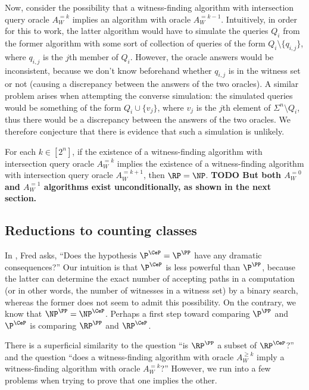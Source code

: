 \documentclass{article}
\newcommand{\todo}[1]{\textbf{TODO #1}}
\begin{document}
Now, consider the possibility that a witness-finding algorithm with intersection query oracle $A^{= k}_W$ implies an algorithm with oracle $A^{= k - 1}_W$.
Intuitively, in order for this to work, the latter algorithm would have to simulate the queries $Q_i$ from the former algorithm with some sort of collection of queries of the form $Q_i \setminus \{q_{i, j}\}$, where $q_{i, j}$ is the $j$th member of $Q_i$.
However, the oracle answers would be inconsistent, because we don't know beforehand whether $q_{i, j}$ is in the witness set or not (causing a discrepancy between the answers of the two oracles).
A similar problem arises when attempting the converse simulation: the simulated queries would be something of the form $Q_i \cup \{v_j\}$, where $v_j$ is the $j$th element of $\Sigma^n \setminus Q_i$, thus there would be a discrepancy between the answers of the two oracles.
We therefore conjecture that there is evidence that such a simulation is unlikely.

\begin{conjecture}
  For each $k \in \left[2^n\right]$, if the existence of a witness-finding algorithm with intersection query oracle $A^{= k}_W$ implies the existence of a witness-finding algorithm with intersection query oracle $A^{= k + 1}_W$, then $\RP = \NP$.
  \todo{But both $A^{= 0}_W$ and $A^{= 1}_W$ algorithms exist unconditionally, as shown in the next section.}
\end{conjecture}

\subsection{Reductions to counting classes}

In \autocite[Section~7]{green93}, Fred asks, ``Does the hypothesis $\P^{\CeP} = \P^\PP$ have any dramatic consequences?''
Our intuition is that $\P^{\CeP}$ is less powerful than $\P^\PP$, because the latter can determine the exact number of accepting paths in a computation (or in other words, the number of witnesses in a witness set) by a binary search, whereas the former does not seem to admit this possibility.
On the contrary, we know that $\NP^\PP = \NP^{\CeP}$.
Perhaps a first step toward comparing $\P^\PP$ and $\P^{\CeP}$ is comparing $\RP^\PP$ and $\RP^{\CeP}$.

There is a superficial similarity to the question ``is $\RP^\PP$ a subset of $\RP^{\CeP}$?'' and the question ``does a witness-finding algorithm with oracle $A^{\geq k}_W$ imply a witness-finding algorithm with oracle $A^{= k}_W$?''
However, we run into a few problems when trying to prove that one implies the other.
\end{document}
